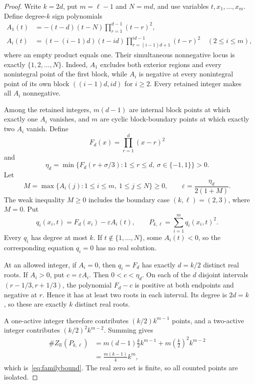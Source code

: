 \documentclass[a4paper,11pt]{amsart}
\theoremstyle{remark}
\newcommand{\R}{\mathbb R}
\begin{document}
\begin{proof}
Write $k=2d$, put $m=\ell-1$ and $N=md$, and use variables $t,x_1,\ldots,x_m$. Define degree-$k$ sign polynomials
\begin{align*}
 A_1(t)&=-(t-d)(t-N)\prod_{r=1}^{d-1}(t-r)^2,\\
 A_i(t)&=(t-(i-1)d)(t-id)
          \prod_{r=(i-1)d+1}^{id-1}(t-r)^2\quad(2\le i\le m),
\end{align*}
where an empty product equals one. Their simultaneous nonnegative locus is exactly $\{1,2,\ldots,N\}$. Indeed, $A_1$ excludes both exterior regions and every nonintegral point of the first block, while $A_i$ is negative at every nonintegral point of its own block $((i-1)d,id)$ for $i\ge2$. Every retained integer makes all $A_i$ nonnegative.

Among the retained integers, $m(d-1)$ are internal block points at which exactly one $A_i$ vanishes, and $m$ are cyclic block-boundary points at which exactly two $A_i$ vanish. Define
\[
 F_d(x)=\prod_{r=1}^d(x-r)^2
\]
and
\[
 \eta_d=\min\{F_d(r+\sigma/3):1\le r\le d,\ \sigma\in\{-1,1\}\}>0.
\]
Let
\[
 M=\max\{A_i(j):1\le i\le m,\ 1\le j\le N\}\ge0,
 \qquad
 \varepsilon=\frac{\eta_d}{2(1+M)}.
\]
The weak inequality $M\ge0$ includes the boundary case $(k,\ell)=(2,3)$, where $M=0$. Put
\[
 q_i(x_i,t)=F_d(x_i)-\varepsilon A_i(t),
 \qquad
 P_{k,\ell}=\sum_{i=1}^m q_i(x_i,t)^2.
\]
Every $q_i$ has degree at most $k$. If $t\notin\{1,\ldots,N\}$, some $A_i(t)<0$, so the corresponding equation $q_i=0$ has no real solution.

At an allowed integer, if $A_i=0$, then $q_i=F_d$ has exactly $d=k/2$ distinct real roots. If $A_i>0$, put $c=\varepsilon A_i$. Then $0<c<\eta_d$. On each of the $d$ disjoint intervals $(r-1/3,r+1/3)$, the polynomial $F_d-c$ is positive at both endpoints and negative at $r$. Hence it has at least two roots in each interval. Its degree is $2d=k$, so these are exactly $k$ distinct real roots.

A one-active integer therefore contributes $(k/2)k^{m-1}$ points, and a two-active integer contributes $(k/2)^2k^{m-2}$. Summing gives
\[
 \begin{aligned}
 \#Z_{\R}(P_{k,\ell})
 &=m(d-1)\frac{k}{2}k^{m-1}
   +m\left(\frac{k}{2}\right)^2k^{m-2}\\
 &=\frac{m(k-1)}4k^m,
 \end{aligned}
\]
which is~\eqref{eq:familybound}. The real zero set is finite, so all counted points are isolated.
\end{proof}
\end{document}
